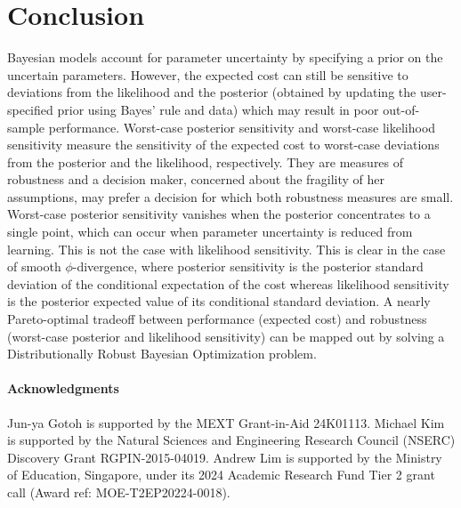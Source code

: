 \documentclass[11pt,reqno,letter]{amsart}
\theoremstyle{plain}
\theoremstyle{definition}
\numberwithin{equation}{section}
\numberwithin{theorem}{section}
\numberwithin{table}{section}
\numberwithin{figure}{section}
\begin{document}
\section{Conclusion}
\label{sec:conclusion}

Bayesian models account for parameter uncertainty by specifying a prior on the uncertain parameters. However, the expected cost can still be sensitive to deviations from the  likelihood and the posterior (obtained by updating the user-specified prior using Bayes' rule and data) which may result in poor out-of-sample performance. Worst-case posterior sensitivity and worst-case likelihood sensitivity measure the sensitivity of the expected cost to worst-case deviations from the posterior and the likelihood, respectively. They are measures of robustness and a decision maker, concerned about the fragility of her assumptions, may prefer a decision for which both robustness measures are small. Worst-case posterior sensitivity vanishes when the posterior concentrates to a single point, which can occur when parameter uncertainty is reduced from learning. This is not the case with likelihood sensitivity. This is clear in the case of smooth $\phi$-divergence, where posterior sensitivity is the posterior standard deviation of the conditional expectation of the cost whereas likelihood sensitivity is the posterior expected value of its conditional standard deviation.
A nearly Pareto-optimal tradeoff between performance (expected cost) and robustness (worst-case posterior and likelihood sensitivity) can be mapped out by solving a Distributionally Robust Bayesian Optimization problem. 




\paragraph{\bf Acknowledgments}
Jun-ya Gotoh is supported by the MEXT Grant-in-Aid 24K01113.
Michael Kim is supported  by the Natural Sciences and Engineering Research Council (NSERC) Discovery Grant RGPIN-2015-04019.
Andrew Lim is supported by the  Ministry of Education, Singapore, under its  2024 Academic Research Fund Tier 2 grant call (Award ref: MOE-T2EP20224-0018).


\newpage




\newpage


\appendix
\end{document}
